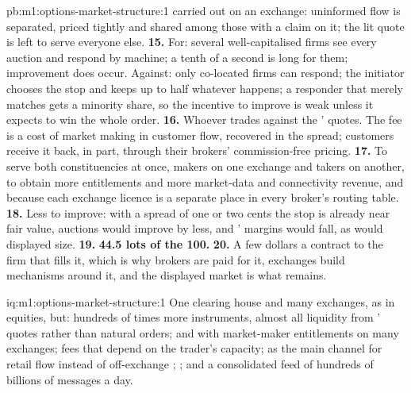\begin{solution}{pb:m1:options-market-structure:1}
carried out on an exchange: uninformed flow is separated, priced tightly and
shared among those with a claim on it; the lit quote is left to serve
everyone else.
\textbf{15.} For: several well-capitalised firms see every auction and
respond by machine; a tenth of a second is long for them; improvement does
occur. Against: only co-located firms can respond; the initiator chooses the
stop and keeps up to half whatever happens; a responder that merely matches
gets a minority share, so the incentive to improve is weak unless it expects
to win the whole order.
\textbf{16.} Whoever trades against the ' quotes. The fee is a
cost of market making in customer flow, recovered in the spread; customers
receive it back, in part, through their brokers' commission-free pricing.
\textbf{17.} To serve both constituencies at once, makers on one exchange
and takers on another, to obtain more entitlements and more market-data and
connectivity revenue, and because each exchange licence is a separate place
in every broker's routing table.
\textbf{18.} Less to improve: with a spread of one or two cents the stop is
already near fair value, auctions would improve by less, and '
margins would fall, as would displayed size.
\textbf{19.} \textbf{44.5 lots of the 100.}
\textbf{20.} A few dollars a contract to the firm that fills it, which is why
brokers are paid for it, exchanges build mechanisms around it, and the
displayed market is what remains.
\end{solution}

\begin{solution}{iq:m1:options-market-structure:1}
One clearing house and many exchanges, as in equities, but: hundreds of
times more instruments, almost all liquidity from ' quotes
rather than natural orders;  and  with
market-maker entitlements on many exchanges; fees that depend on the
trader's capacity;  as the main channel for retail
flow instead of off-exchange ; ; and a
consolidated feed of hundreds of billions of messages a day.
\end{solution}

